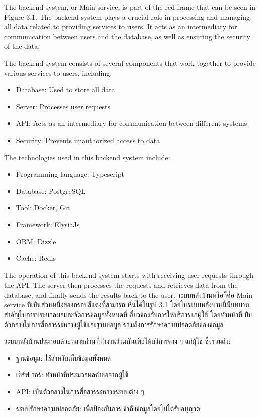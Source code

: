 \ifenglish
The backend system, or Main service, is part of the red frame that can be seen in Figure 3.1. The backend system plays a crucial role in processing and managing all data related to providing services to users. It acts as an intermediary for communication between users and the database, as well as ensuring the security of the data.

The backend system consists of several components that work together to provide various services to users, including:
\begin{itemize}
    \item Database: Used to store all data
    \item Server: Processes user requests
    \item API: Acts as an intermediary for communication between different systems
    \item Security: Prevents unauthorized access to data
\end{itemize}

The technologies used in this backend system include:
\begin{itemize}
    \item Programming language: Typescript
    \item Database: PostgreSQL
    \item Tool: Docker, Git
    \item Framework: ElysiaJs
    \item ORM: Dizzle
    \item Cache: Redis
\end{itemize}

The operation of this backend system starts with receiving user requests through the API. The server then processes the requests and retrieves data from the database, and finally sends the results back to the user.
\else 
ระบบหลังบ้านหรือก็คือ Main service ที่เป็นส่วนหนึ่งของกรอบสีแดงที่สามารถเห็นได้ในรูป 3.1 โดยในระบบหลังบ้านนี้มีบทบาทสำคัญในการประมวลผลและจัดการข้อมูลทั้งหมดที่เกี่ยวข้องกับการให้บริการแก่ผู้ใช้ โดยทำหน้าที่เป็นตัวกลางในการสื่อสารระหว่างผู้ใช้และฐานข้อมูล รวมถึงการรักษาความปลอดภัยของข้อมูล

ระบบหลังบ้านประกอบด้วยหลายส่วนที่ทำงานร่วมกันเพื่อให้บริการต่าง ๆ แก่ผู้ใช้ ซึ่งรวมถึง:
\begin{itemize}
    \item ฐานข้อมูล: ใช้สำหรับเก็บข้อมูลทั้งหมด
    \item เซิร์ฟเวอร์: ทำหน้าที่ประมวลผลคำขอจากผู้ใช้
    \item API: เป็นตัวกลางในการสื่อสารระหว่างระบบต่าง ๆ
    \item ระบบรักษาความปลอดภัย: เพื่อป้องกันการเข้าถึงข้อมูลโดยไม่ได้รับอนุญาต
\end{itemize}

